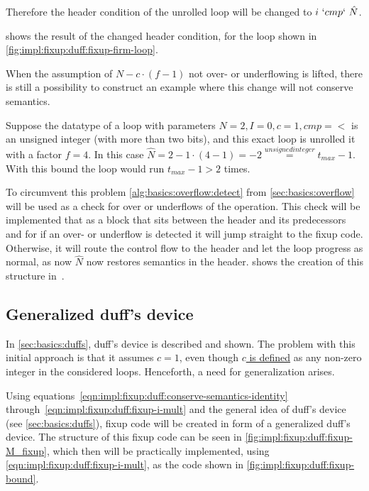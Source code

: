 Therefore the header condition of the unrolled loop will be changed to $i~`cmp`~\hat{N}$.

 shows the result of the changed header condition, for the loop shown in \cref{fig:impl:fixup:duff:fixup-firm-loop}.



When the assumption of $N - c \cdot (f - 1)$ not over- or underflowing is lifted, there is still a possibility to construct an example where this change will not conserve semantics.

Suppose the datatype of a loop with parameters $N = 2, I = 0, c = 1, cmp = <$ is an unsigned integer (with more than two bits), and this exact loop is unrolled it with a factor $f = 4$.
In this case $\hat{N} = 2 - 1 \cdot (4 - 1) = -2 \overset{unsigned integer}{=} t_{max} - 1$.
With this bound the loop would run $t_{max} - 1 > 2$ times.

To circumvent this problem \cref{alg:basics:overflow:detect} from \cref{sec:basics:overflow} will be used as a check for over or underflows of the operation.
This check will be implemented that as a block that sits between the header and its predecessors and for if an over- or underflow is detected it will jump straight to the fixup code.
Otherwise, it will route the control flow to the header and let the loop progress as normal, as now $\hat{N}$ now restores semantics in the header.
 shows the creation of this structure in~\libFIRM.



\subsection{Generalized duff's device}\label{sec:impl:fixup:duff}

In \cref{sec:basics:duffs}, duff's device is described and shown.
The problem with this initial approach is that it assumes $c = 1$, even though \hyperref[sec:impl::def-c]{$c$ is defined} as any non-zero integer in the considered loops.
Henceforth, a need for generalization arises.

Using equations~\ref{eqn:impl:fixup:duff:conserve-semantics-identity} through~\ref{eqn:impl:fixup:duff:fixup-i-mult} and the general idea of duff's device (see \cref{sec:basics:duffs}), fixup code will be created in form of a generalized duff's device.
The structure of this fixup code can be seen in \cref{fig:impl:fixup:duff:fixup-M_fixup}, which then will be practically implemented, using \cref{eqn:impl:fixup:duff:fixup-i-mult}, as the code shown in \cref{fig:impl:fixup:duff:fixup-bound}.

